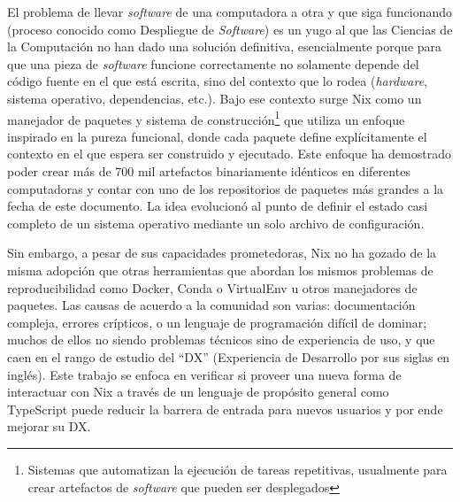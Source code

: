 El problema de llevar \emph{software} de una computadora a otra y que siga funcionando (proceso conocido como Despliegue de \emph{Software}) es un yugo al que las Ciencias de la Computación no han dado una solución definitiva, esencialmente porque para que una pieza de \emph{software} funcione correctamente no solamente depende del código fuente en el que está escrita, sino del contexto que lo rodea (\emph{hardware}, sistema operativo, dependencias, etc.). Bajo ese contexto surge Nix como un manejador de paquetes y sistema de construcción\footnote{Sistemas que automatizan la ejecución de tareas repetitivas, usualmente para crear artefactos de \emph{software} que pueden ser desplegados} que utiliza un enfoque inspirado en la pureza funcional, donde cada paquete define explícitamente el contexto en el que espera ser construido y ejecutado. Este enfoque ha demostrado poder crear más de 700 mil artefactos binariamente idénticos en diferentes computadoras y contar con uno de los repositorios de paquetes más grandes a la fecha de este documento. La idea evolucionó al punto de definir el estado casi completo de un sistema operativo mediante un solo archivo de configuración.

Sin embargo, a pesar de sus capacidades prometedoras, Nix no ha gozado de la misma adopción que otras herramientas que abordan los mismos problemas de reproducibilidad como Docker, Conda o VirtualEnv u otros manejadores de paquetes. Las causas de acuerdo a la comunidad son varias: documentación compleja, errores crípticos, o un lenguaje de programación difícil de dominar; muchos de ellos no siendo problemas técnicos sino de experiencia de uso, y que caen en el rango de estudio del ``DX'' (Experiencia de Desarrollo por sus siglas en inglés). Este trabajo se enfoca en verificar si proveer una nueva forma de interactuar con Nix a través de un lenguaje de propósito general como TypeScript puede reducir la barrera de entrada para nuevos usuarios y por ende mejorar su DX.
